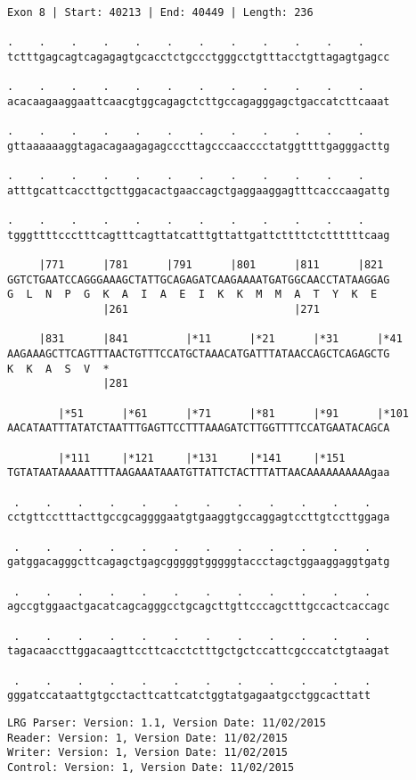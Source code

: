 \documentclass{article}
\begin{document}
\begin{Verbatim}
Exon 8 | Start: 40213 | End: 40449 | Length: 236
 
.    .    .    .    .    .    .    .    .    .    .    .    
tctttgagcagtcagagagtgcacctctgccctgggcctgtttacctgttagagtgagcc
  
.    .    .    .    .    .    .    .    .    .    .    .    
acacaagaaggaattcaacgtggcagagctcttgccagagggagctgaccatcttcaaat
  
.    .    .    .    .    .    .    .    .    .    .    .    
gttaaaaaaggtagacagaagagagcccttagcccaacccctatggttttgagggacttg
  
.    .    .    .    .    .    .    .    .    .    .    .    
atttgcattcaccttgcttggacactgaaccagctgaggaaggagtttcacccaagattg
  
.    .    .    .    .    .    .    .    .    .    .    .    
tgggttttccctttcagtttcagttatcatttgttattgattcttttctcttttttcaag
  
     |771      |781      |791      |801      |811      |821 
GGTCTGAATCCAGGGAAAGCTATTGCAGAGATCAAGAAAATGATGGCAACCTATAAGGAG
G  L  N  P  G  K  A  I  A  E  I  K  K  M  M  A  T  Y  K  E  
               |261                          |271           
  
     |831      |841         |*11      |*21      |*31      |*41
AAGAAAGCTTCAGTTTAACTGTTTCCATGCTAAACATGATTTATAACCAGCTCAGAGCTG
K  K  A  S  V  *   
               |281                                         
  
        |*51      |*61      |*71      |*81      |*91      |*101
AACATAATTTATATCTAATTTGAGTTCCTTTAAAGATCTTGGTTTTCCATGAATACAGCA
  
        |*111     |*121     |*131     |*141     |*151       
TGTATAATAAAAATTTTAAGAAATAAATGTTATTCTACTTTATTAACAAAAAAAAAAgaa
  
 .    .    .    .    .    .    .    .    .    .    .    .   
cctgttcctttacttgccgcaggggaatgtgaaggtgccaggagtccttgtccttggaga
  
 .    .    .    .    .    .    .    .    .    .    .    .   
gatggacagggcttcagagctgagcgggggtgggggtaccctagctggaaggaggtgatg
  
 .    .    .    .    .    .    .    .    .    .    .    .   
agccgtggaactgacatcagcagggcctgcagcttgttcccagctttgccactcaccagc
  
 .    .    .    .    .    .    .    .    .    .    .    .   
tagacaaccttggacaagttccttcacctctttgctgctccattcgcccatctgtaagat
  
 .    .    .    .    .    .    .    .    .    .    .    .
gggatccataattgtgcctacttcattcatctggtatgagaatgcctggcacttatt
\end{Verbatim}
\newpage
\begin{Verbatim}
LRG Parser: Version: 1.1, Version Date: 11/02/2015
Reader: Version: 1, Version Date: 11/02/2015
Writer: Version: 1, Version Date: 11/02/2015
Control: Version: 1, Version Date: 11/02/2015
\end{Verbatim}
\end{document}
